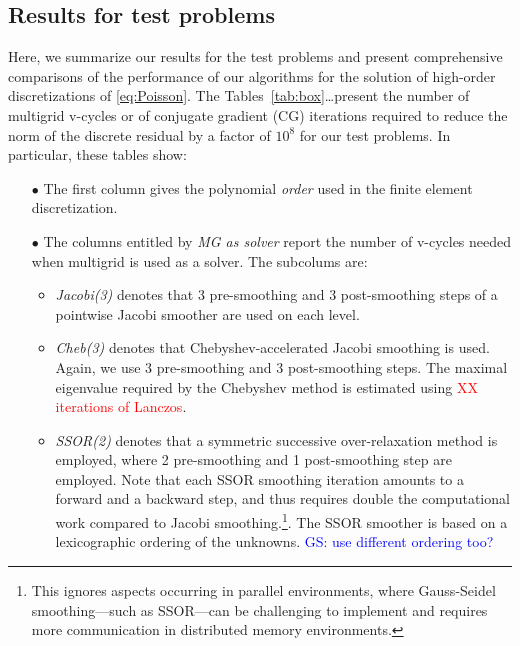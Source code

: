 \documentclass[smallcondensed,final]{svjour3}     %
\newcommand{\todo}[1]{\textcolor{red}{ #1}}
\newcommand{\gsnote}[1]{\textcolor{blue}{GS: #1}}
\begin{document}
\subsection{Results for test problems}\label{subsec:results}
Here, we summarize our results for the test problems and present
comprehensive comparisons of the performance of our algorithms for the
solution of high-order discretizations of \eqref{eq:Poisson}.  The
Tables~\ref{tab:box}\ldots present the number of multigrid v-cycles or
of conjugate gradient (CG) iterations required to reduce the norm of
the discrete residual by a factor of $10^8$ for our test problems. In
particular, these tables show:
\begin{itemize}
\item[$\bullet$] The first column gives the polynomial \emph{order}
  used in the finite element discretization.
\item[$\bullet$] The columns entitled by \emph{MG as solver} report
  the number of v-cycles needed when multigrid is used as a
  solver. The subcolums are:
  \begin{itemize}
  \item \emph{Jacobi(3)} denotes that 3 pre-smoothing and 3
    post-smoothing steps of a pointwise Jacobi smoother are used on
    each level.
  \item \emph{Cheb(3)} denotes that Chebyshev-accelerated Jacobi
    smoothing is used. Again, we use 3 pre-smoothing and 3
    post-smoothing steps. The maximal eigenvalue required by the
    Chebyshev method is estimated using \todo{XX iterations of
      Lanczos}.
  \item \emph{SSOR(2)} denotes that a symmetric successive
    over-relaxation method is employed, where 2 pre-smoothing and 1
    post-smoothing step are employed. Note that each SSOR smoothing
    iteration amounts to a forward and a backward step, and thus
    requires double the computational work compared to Jacobi
    smoothing.\footnote{This ignores aspects occurring in parallel
      environments, where Gauss-Seidel smoothing---such as SSOR---can
      be challenging to implement and requires more communication in
      distributed memory environments.}. The SSOR smoother is based on 
			a lexicographic ordering of  the unknowns. 
			\gsnote{use different ordering too?}
	\end{itemize}
	

\end{itemize}
\end{document}
